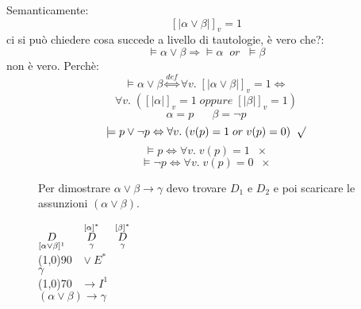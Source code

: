 \documentclass{article}
\theoremstyle{break}
\theoremstyle{break}
\theoremstyle{break}
\theoremstyle{break}
\begin{document}
Semanticamente:
\[
    [|\alpha \vee \beta|]_v=1
\] 
ci si può chiedere cosa succede a livello di tautologie, è vero che?:
\[
\models \alpha \vee \beta \Rightarrow \models \alpha\;\;or\;\; \models \beta
\] 
non è vero. Perchè:
\[
    \models \alpha \vee \beta \stackrel{def}{\Leftrightarrow} \forall v.\; [|\alpha \vee \beta|]_v=1 \Leftrightarrow
\] 
\[
    \forall v.\; ([|\alpha|]_v=1 \; oppure\; [|\beta|]_v=1)
\] 
\[
\alpha = p \;\;\;\;\;\; \beta = \neg p
\] 
\[
\models p \vee \neg p \Leftrightarrow \forall v.\; (v(p) = 1 \; or\; v(p) = 0)\;\; \surd
\] 
\[
\models p \Leftrightarrow \forall v. \; v(p) = 1\;\; \times
\] 
\[
\models \neg p \Leftrightarrow \forall v. \; v(p) = 0\;\; \times
\] 
\begin{figure}[H]
    \begin{example}
        Per dimostrare \( \alpha \vee \beta \to \gamma \) devo trovare \( D_1 \) e \( D_2 \) e poi scaricare le
        assunzioni \( (\alpha \vee \beta) \).

        \begin{center}
            \( \underset{[\alpha \vee \beta]^1}{D} \hspace{0.5cm} \stackrel{[\alpha]^*}{\underset{\gamma}{D}} \hspace{0.5cm} \stackrel{[\beta]^*}{\underset{\gamma}{D}} \)\\
            \hspace{0.9cm}\line(1,0){90}\(\;\;\; \vee E^* \)\\  
            \( \gamma \)\\
            \hspace{0.9cm}\line(1,0){70}\(\;\;\; \to I^1 \)\\  
            \( (\alpha \vee \beta) \to \gamma \) 
        \end{center}
    \end{example}
\end{figure}
\end{document}
